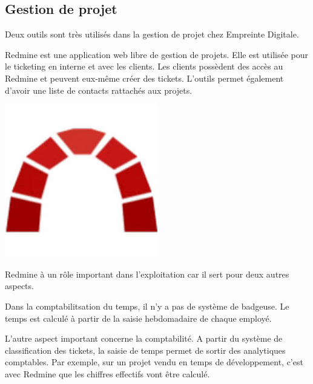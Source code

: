 \documentclass[12pt]{article}
\begin{document}
\newpage
\subsection{Gestion de projet}
Deux outils sont très utilisés dans la gestion de projet chez Empreinte Digitale. \\

\noindent%
\begin{minipage}{.7\textwidth}%
\gls{Redmine} est une application web libre de gestion de projets.
Elle est utilisée pour le ticketing en interne et avec les clients.
Les clients possèdent des accès au \gls{Redmine} et peuvent eux-même créer des tickets.
L'outils permet également d'avoir une liste de contacts rattachés aux projets. \\
\end{minipage}%
\hfill
\begin{minipage}{.3\textwidth}%
\begin{center}
\includegraphics[width=0.5\textwidth]{src/logo_redmine.jpeg}
\end{center}
\end{minipage}%

\gls{Redmine} à un rôle important dans l'exploitation car il sert pour deux autres aspects.

Dans la comptabilitsation du temps, il n'y a pas de système de badgeuse.
Le temps est calculé à partir de la saisie hebdomadaire de chaque employé.

L'autre aspect important concerne la comptabilité.
A partir du système de classification des tickets, la saisie de temps permet de sortir des analytiques comptables.
Par exemple, sur un projet vendu en temps de développement, c'est avec \gls{Redmine} que les chiffres effectifs vont être calculé. \\
\end{document}
